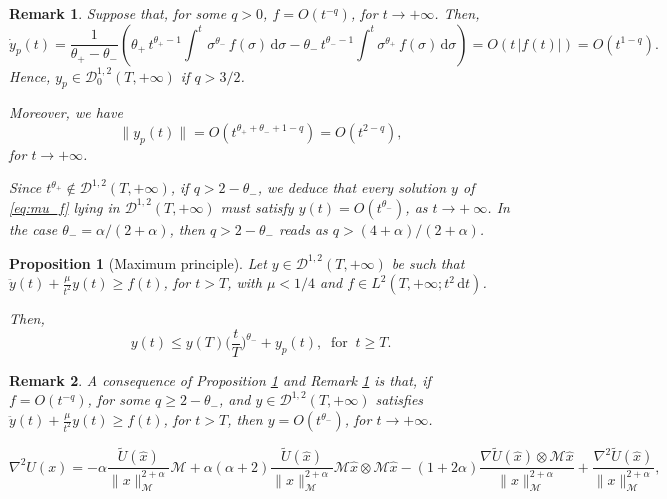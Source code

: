 \documentclass[10pt,a4paper]{amsart}
\newtheorem{prop}{Proposition}
\newtheorem{rem}{Remark}
\newcommand{\ud}{\mathrm{d}}
\begin{document}
\begin{rem}
\label{rem:f_gamma}
    Suppose that, for some $q>0$, $f=O(t^{-q})$, for $t\rightarrow+\infty$. Then,
    \[
    \dot y_p(t)=\frac{1}{\theta_+-\theta_-}\left(\theta_+\,t^{\theta_+-1}\int^t\,\sigma^{\theta_-}\,f(\sigma)\,\ud\sigma - \theta_- \, t^{\theta_--1}\int^t \sigma^{\theta_+}\,f(\sigma)\,\ud\sigma\right) =O(t\,|f(t)|)=O(t^{1-q}).
    \]
    Hence, $y_p \in \mathcal{D}_0^{1,2}(T,+\infty)$ if $q>3/2$. 
    
    Moreover, we have  
    \[
    \|y_p(t)\|= O(t^{{\theta_+}+{\theta_-}+1-q})=O(t^{2-q}),
    \]
    for $t\rightarrow+\infty$.

    Since $t^{\theta_+} \notin \mathcal{D}^{1,2}(T,+\infty)$, if $q > 2-\theta_-$, we deduce that every solution $y$ of \eqref{eq:mu_f} lying in $\mathcal{D}^{1,2}(T,+\infty)$ must satisfy $y(t)=O(t^{\theta_-})$, as $t\to+\ \infty$. In the case $\theta_-=\alpha/(2+\alpha)$, then $q > 2-\theta_-$ reads as $q > (4+\alpha)/(2+\alpha)$.
\end{rem}

\begin{prop}[Maximum principle]\label{prop:max_principle}
Let $y\in\mathcal{D}^{1,2}(T,+\infty)$ be such that $
\ddot{y}(t) + \frac{\mu}{t^2}y(t) \ge f(t)$, for  $t>T$, with $\mu <1/4$ and $f \in L^2(T,+\infty;t^2\,\ud t)$.

Then,
\[
y(t) \le y(T)\bigg(\frac{t}{T}\bigg)^{\theta_-} + y_p(t), \ \mbox{ for } \ t\ge T.
\]
\end{prop}

\begin{rem}
\label{rem:corollary}
    A consequence of Proposition \ref{prop:max_principle} and Remark \ref{rem:f_gamma} is that, if $f=O(t^{-q})$, for some $q \ge 2-\theta_-$, and $y\in \mathcal{D}^{1,2}(T,+\infty)$ satisfies $\ddot y(t)+\frac{\mu}{t^2}y(t)\ge f(t)$, for $t >T$, then $y=O(t^{\theta_-})$, for $t\rightarrow+\infty$.
\end{rem}

\begin{equation}
\label{eq:hessian}{
\nabla^2 U(x) = - \alpha\frac{\tilde U(\hat x)}{\|x\|_{\mathcal M}^{2+\alpha}}\mathcal M+\alpha(\alpha+2)\frac{\tilde U(\hat x)}{\|x\|_{\mathcal M}^{2+\alpha}}\mathcal M\hat x\otimes \mathcal M\hat x - (1+2\alpha)\frac{\nabla\tilde U(\hat x)\otimes \mathcal M\hat x}{\|x\|_{\mathcal M}^{2+\alpha}}  +\frac{\nabla^2\tilde  U(\hat x)}{\|x\|_{\mathcal M}^{2+\alpha}},}
\end{equation}
\end{document}
